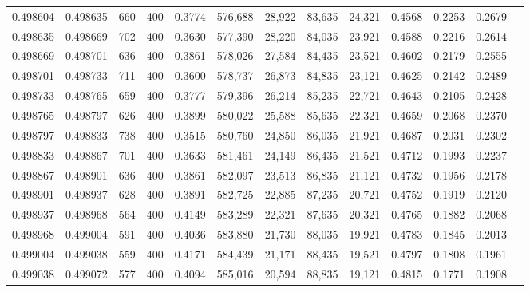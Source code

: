 \begin{tabular}{rrrrrrrrrrrrr}
0.498604 & 0.498635 &    660 & 400 &                                     0.3774 & 576,688 &  28,922 &  83,635 &  24,321 & 0.4568 & 0.2253 & 0.2679 \\
0.498635 & 0.498669 &    702 & 400 &                                     0.3630 & 577,390 &  28,220 &  84,035 &  23,921 & 0.4588 & 0.2216 & 0.2614 \\
0.498669 & 0.498701 &    636 & 400 &                                     0.3861 & 578,026 &  27,584 &  84,435 &  23,521 & 0.4602 & 0.2179 & 0.2555 \\
0.498701 & 0.498733 &    711 & 400 &                                     0.3600 & 578,737 &  26,873 &  84,835 &  23,121 & 0.4625 & 0.2142 & 0.2489 \\
0.498733 & 0.498765 &    659 & 400 &                                     0.3777 & 579,396 &  26,214 &  85,235 &  22,721 & 0.4643 & 0.2105 & 0.2428 \\
0.498765 & 0.498797 &    626 & 400 &                                     0.3899 & 580,022 &  25,588 &  85,635 &  22,321 & 0.4659 & 0.2068 & 0.2370 \\
0.498797 & 0.498833 &    738 & 400 &                                     0.3515 & 580,760 &  24,850 &  86,035 &  21,921 & 0.4687 & 0.2031 & 0.2302 \\
0.498833 & 0.498867 &    701 & 400 &                                     0.3633 & 581,461 &  24,149 &  86,435 &  21,521 & 0.4712 & 0.1993 & 0.2237 \\
0.498867 & 0.498901 &    636 & 400 &                                     0.3861 & 582,097 &  23,513 &  86,835 &  21,121 & 0.4732 & 0.1956 & 0.2178 \\
0.498901 & 0.498937 &    628 & 400 &                                     0.3891 & 582,725 &  22,885 &  87,235 &  20,721 & 0.4752 & 0.1919 & 0.2120 \\
0.498937 & 0.498968 &    564 & 400 &                                     0.4149 & 583,289 &  22,321 &  87,635 &  20,321 & 0.4765 & 0.1882 & 0.2068 \\
0.498968 & 0.499004 &    591 & 400 &                                     0.4036 & 583,880 &  21,730 &  88,035 &  19,921 & 0.4783 & 0.1845 & 0.2013 \\
0.499004 & 0.499038 &    559 & 400 &                                     0.4171 & 584,439 &  21,171 &  88,435 &  19,521 & 0.4797 & 0.1808 & 0.1961 \\
0.499038 & 0.499072 &    577 & 400 &                                     0.4094 & 585,016 &  20,594 &  88,835 &  19,121 & 0.4815 & 0.1771 & 0.1908 \\

\end{tabular}
